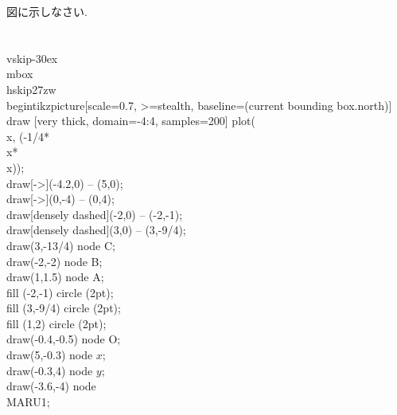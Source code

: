 図に示しなさい.
\\\\
\\vskip-30ex
\\mbox{}\\hskip27zw
\\begin{tikzpicture}[scale=0.7, >=stealth, baseline=(current bounding box.north)]
 \\draw [very thick, domain=-4:4, samples=200] plot(\\x, {(-1/4*\\x*\\x)});
 \\draw[->](-4.2,0) -- (5,0);
 \\draw[->](0,-4) -- (0,4);
 \\draw[densely dashed](-2,0) -- (-2,-1);
 \\draw[densely dashed](3,0) -- (3,-9/4);
 \\draw(3,-13/4) node {C};
 \\draw(-2,-2) node {B};
 \\draw(1,1.5) node {A};
 \\fill (-2,-1) circle (2pt);
 \\fill (3,-9/4) circle (2pt);
 \\fill (1,2) circle (2pt);
 \\draw(-0.4,-0.5) node {O};
 \\draw(5,-0.3) node {$x$};
 \\draw(-0.3,4) node {$y$};
 \\draw(-3.6,-4) node {\\MARU{1}};

